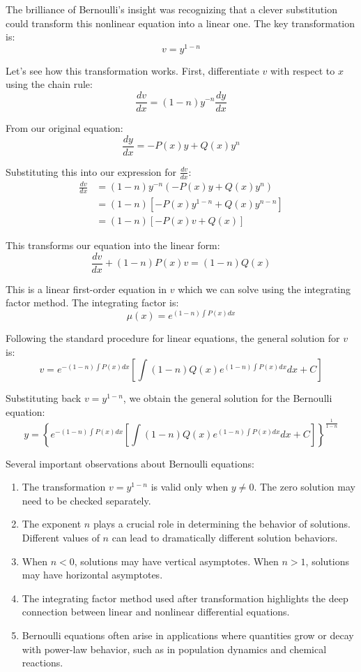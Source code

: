 \noindent The brilliance of Bernoulli's insight was recognizing that a clever substitution could transform this nonlinear equation into a linear one. The key transformation is:
\[
v = y^{1-n}
\]

\noindent Let's see how this transformation works. First, differentiate $v$ with respect to $x$ using the chain rule:
\[
\frac{dv}{dx} = (1-n)y^{-n}\frac{dy}{dx}
\]

\noindent From our original equation:
\[
\frac{dy}{dx} = -P(x)y + Q(x)y^n
\]

\noindent Substituting this into our expression for $\frac{dv}{dx}$:
\begin{align*}
\frac{dv}{dx} &= (1-n)y^{-n}(-P(x)y + Q(x)y^n) \\
&= (1-n)[-P(x)y^{1-n} + Q(x)y^{n-n}] \\
&= (1-n)[-P(x)v + Q(x)]
\end{align*}

\noindent This transforms our equation into the linear form:
\[
\frac{dv}{dx} + (1-n)P(x)v = (1-n)Q(x)
\]

\noindent This is a linear first-order equation in $v$ which we can solve using the integrating factor method. The integrating factor is:
\[
\mu(x) = e^{(1-n)\int P(x)dx}
\]

\noindent Following the standard procedure for linear equations, the general solution for $v$ is:
\[
v = e^{-(1-n)\int P(x)dx}\left[\int (1-n)Q(x)e^{(1-n)\int P(x)dx}dx + C\right]
\]

\noindent Substituting back $v = y^{1-n}$, we obtain the general solution for the Bernoulli equation:
\[
y = \left\{e^{-(1-n)\int P(x)dx}\left[\int (1-n)Q(x)e^{(1-n)\int P(x)dx}dx + C\right]\right\}^{\frac{1}{1-n}}
\]

\noindent Several important observations about Bernoulli equations:
\begin{enumerate}
    \item The transformation $v = y^{1-n}$ is valid only when $y \neq 0$. The zero solution may need to be checked separately.
    
    \item The exponent $n$ plays a crucial role in determining the behavior of solutions. Different values of $n$ can lead to dramatically different solution behaviors.
    
    \item When $n < 0$, solutions may have vertical asymptotes. When $n > 1$, solutions may have horizontal asymptotes.
    
    \item The integrating factor method used after transformation highlights the deep connection between linear and nonlinear differential equations.
    
    \item Bernoulli equations often arise in applications where quantities grow or decay with power-law behavior, such as in population dynamics and chemical reactions.
\end{enumerate}

